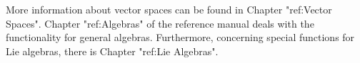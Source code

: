 
More information about vector spaces can be found in Chapter 
"ref:Vector Spaces".
Chapter "ref:Algebras" of the reference manual deals with the
functionality for general algebras. Furthermore, concerning special
functions for Lie algebras, there is Chapter "ref:Lie Algebras".



